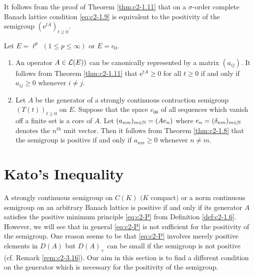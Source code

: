 \begin{remark}\label{rem:c2-1.12}
It follows from the proof of Theorem \ref{thm:c2-1.11}   that on a $\sigma$-order complete Banach lattice condition  \eqref{eq:c2-1.9} is equivalent to the positivity of the semigroup $(\mathrm{e}^{tA})_{t \geq 0}$.
\end{remark}
\begin{examples}\label{ex:c2-1.13}
Let $E = \ell^p$ $(1 \leq p \leq \infty)$ or $E = c_{0}$.
\begin{enumerate}[\upshape (i), wide, labelsep=.5em] %
\item \label{ex:c2-1.13-1}
An operator $A \in \mathcal{L}(E))$ can be canonically represented by a matrix $(a_{ij})$. 
It follows from Theorem \ref{thm:c2-1.11} that $\mathrm{e}^{tA} \geq 0$ for all $t \geq 0$ if and only if $a_{ij} \geq 0$ whenever $i \neq j$.
\item \label{ex:c2-1.13-2}
Let $A$ be the generator of a strongly continuous contraction semigroup $(T(t))_{t \geq 0}$ on $E$.
Suppose that the space $c_{00}$ of all sequences which vanish off a finite set is a core of $A$.
Let $(a_{nm})_{m \in \mathbb{N}} = (Ae_{n})$ where $e_{n} = (\delta_{nm})_{m \in \mathbb{N}}$ denotes the $n^{th}$ unit vector.
Then it follows from Theorem \ref{thm:c2-1.8}   that the semigroup is positive if and only if $a_{nm} \geq 0$ whenever $n \neq m$.
\end{enumerate}
\end{examples}
\section{Kato's Inequality} \label{sec:c2-2}
A strongly continuous semigroup on $C(K)$ $(K$ compact$)$ or a norm continuous semigroup on an arbitrary Banach lattice is positive if and only if its generator $A$ satisfies the positive minimum principle \eqref{eq:c2-P} from Definition \ref{def:c2-1.6}.
However, we will see that in general \eqref{eq:c2-P} is not sufficient for the positivity of the semigroup.
One reason seems to be that \eqref{eq:c2-P} involves merely positive elements in $D(A)$ but $D(A)_{+}$ can be small if the semigroup is not positive (cf. Remark \ref{rem:c2-3.16}).
Our aim in this section is to find a different condition on the generator which is necessary for the positivity of the semigroup.

